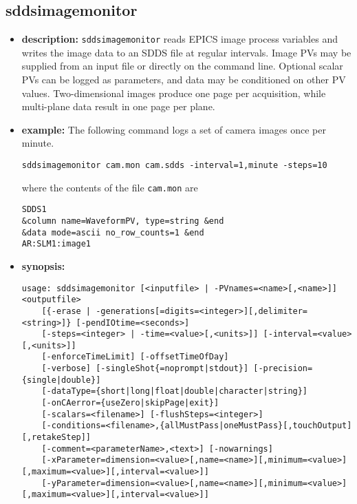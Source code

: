 %
%
\begin{latexonly}
\newpage
\end{latexonly}

%
%
\subsection{sddsimagemonitor}
\label{sddsimagemonitor}

\begin{itemize}
\item {\bf description:}
\verb+sddsimagemonitor+ reads EPICS image process variables and writes the image
  data to an SDDS file at regular intervals. Image PVs may be supplied from an
  input file or directly on the command line. Optional scalar PVs can be logged as
  parameters, and data may be conditioned on other PV values. Two-dimensional
  images produce one page per acquisition, while multi-plane data result in one
  page per plane.
\item {\bf example:}
The following command logs a set of camera images once per minute.
\begin{verbatim}
sddsimagemonitor cam.mon cam.sdds -interval=1,minute -steps=10
\end{verbatim}
where the contents of the file \verb+cam.mon+ are
\begin{verbatim}
SDDS1
&column name=WaveformPV, type=string &end
&data mode=ascii no_row_counts=1 &end
AR:SLM1:image1
\end{verbatim}
\item {\bf synopsis:}
\begin{verbatim}
usage: sddsimagemonitor [<inputfile> | -PVnames=<name>[,<name>]] <outputfile>
    [{-erase | -generations[=digits=<integer>][,delimiter=<string>]} [-pendIOtime=<seconds>]
    [-steps=<integer> | -time=<value>[,<units>]] [-interval=<value>[,<units>]]
    [-enforceTimeLimit] [-offsetTimeOfDay]
    [-verbose] [-singleShot{=noprompt|stdout}] [-precision={single|double}]
    [-dataType={short|long|float|double|character|string}]
    [-onCAerror={useZero|skipPage|exit}]
    [-scalars=<filename>] [-flushSteps=<integer>]
    [-conditions=<filename>,{allMustPass|oneMustPass}[,touchOutput][,retakeStep]]
    [-comment=<parameterName>,<text>] [-nowarnings]
    [-xParameter=dimension=<value>[,name=<name>][,minimum=<value>][,maximum=<value>][,interval=<value>]]
    [-yParameter=dimension=<value>[,name=<name>][,minimum=<value>][,maximum=<value>][,interval=<value>]]

\end{verbatim}
\end{itemize}
